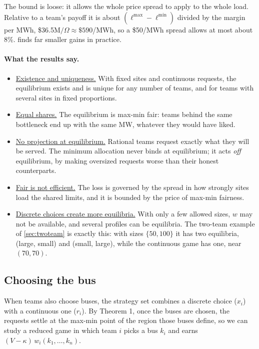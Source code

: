 \documentclass[10pt]{article}
\newcommand{\alert}[1]{{\color{alertblue}\uline{#1}}}
\begin{document}
The bound is loose: it allows the whole price spread to apply to the whole
load. Relative to a team's payoff it is about $(\ell^{\max} -
\ell^{\min})$ divided by the margin per MWh, \$36.5M$/\Omega \approx
\$590$/MWh, so a \$50/MWh spread allows at most about 8\%.
 finds far smaller gains in practice.

\paragraph{What the results say.}
\begin{itemize}[leftmargin=*]
  \item \alert{Existence and uniqueness.} With fixed sites and continuous
    requests, the equilibrium exists and is unique for any number of teams,
    and for teams with several sites in fixed proportions.
  \item \alert{Equal shares.} The equilibrium is max-min fair: teams behind
    the same bottleneck end up with the same MW, whatever they would have liked.
  \item \alert{No projection at equilibrium.} Rational teams request exactly
    what they will be served. The minimum allocation never binds at equilibrium;
    it acts \emph{off} equilibrium, by making oversized requests worse than
    their honest counterparts.
  \item \alert{Fair is not efficient.} The loss is governed by the spread in
    how strongly sites load the shared limits, and it is bounded by the price
    of max-min fairness.
  \item \alert{Discrete choices create more equilibria.} With only a few
    allowed sizes, $w$ may not be available, and several profiles can be
    equilibria. The two-team example of \cref{sec:twoteam} is exactly this: with
    sizes $\{50, 100\}$ it has two equilibria, (large, small) and (small, large),
    while the continuous game has one, near $(70, 70)$.
\end{itemize}

\subsection{Choosing the bus}

When teams also choose buses, the strategy set combines a discrete choice
($x_i$) with a continuous one ($r_i$). By Theorem 1, once the buses are chosen,
the requests settle at the max-min point of the region those buses define, so
we can study a reduced game in which team $i$ picks a bus $k_i$ and earns
$(V - \kappa)\, w_i(k_1, \dots, k_n)$.
\end{document}
